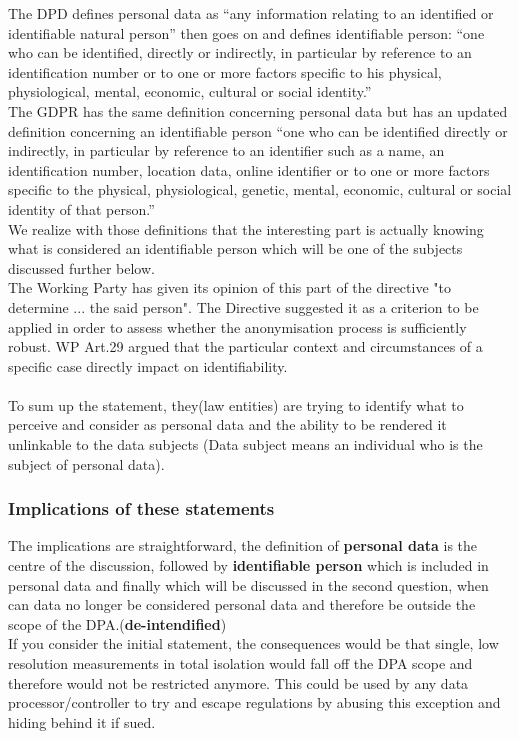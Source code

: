 \documentclass[9pt]{article}
\begin{document}
The DPD defines personal data as \enquote{any information relating to an identified or identifiable natural person}\cite{CJEU - DPD 1995} then goes on and defines identifiable person: \enquote{one who can be identified, directly or indirectly, in particular by reference to an identification number or to one or more factors specific to his physical, physiological, mental, economic, cultural or social identity.} \cite{CJEU - DPD 1995}\\ The GDPR has the same definition concerning personal data but has an updated definition concerning an identifiable person \enquote{one who can be identified directly or indirectly, in particular by reference to an identifier such as a name, an identification number, location data, online identifier or to one or more factors specific to the physical, physiological, genetic, mental, economic, cultural or social identity of that person.} \cite{DPD-GDPR:1995-2018}\\We realize with those definitions that the interesting part is actually knowing what is considered an identifiable person which will be one of the subjects discussed further below.\\ The Working Party has given its opinion of this part of the directive "to determine ... the said person"\cite{CJEU - DPD 1995}. The Directive suggested it as a criterion to be applied in order to assess whether the anonymisation  process is sufficiently robust.\cite{WP29:2007} WP Art.29 argued that the particular context and circumstances of a specific case directly impact on identifiability. \cite{Sophie:2016}\\\\To sum up the statement, they(law entities) are trying to identify what to perceive and consider as personal data and the ability to be rendered it unlinkable to the data subjects (Data subject means an individual who is the subject of personal data).

\subsubsection{Implications of these statements} 

The implications are straightforward, the definition of \textbf{personal data} is the centre of the discussion, followed by \textbf{identifiable person} which is included in personal data and finally which will be discussed in the second question, when can data no longer be considered personal data and therefore be outside the scope of the DPA.(\textbf{de-intendified})\\
If you consider the initial statement, the consequences would be that single, low resolution measurements in total isolation would fall off the DPA scope and therefore would not be restricted anymore. This could be used by any data processor/controller to try and escape regulations by abusing this exception and hiding behind it if sued.
\end{document}
